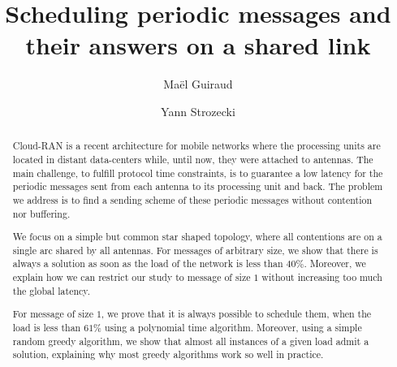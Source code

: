 \documentclass[10pt, conference, letterpaper]{IEEEtran}
\title{Scheduling periodic messages and their answers on a shared link}
\author[1,2]{Ma\"el Guiraud}
\author[1]{Yann Strozecki}
\affil[1]{David Laboratory, UVSQ}
\affil[2]{Nokia Bell Labs France}
\begin{document}
\maketitle








\begin{abstract}
Cloud-RAN is a recent architecture for mobile networks where the processing units are located in distant data-centers while, until now, they were attached to antennas. The main challenge, to fulfill protocol time constraints, is to guarantee a low latency for the periodic messages sent from each antenna to its processing unit and back. The problem we address is to find a sending scheme of these periodic messages without contention nor buffering.

We focus on a simple but common star shaped topology, where all contentions are on a single arc shared by all antennas. For messages of arbitrary size, we show that there is always a solution as soon as the load of the network is less than $40\%$. Moreover, we explain how we can restrict our study to message of size $1$ without increasing too much the global latency. 

For message of size $1$, we prove that it is always possible to schedule them, when the load is less than $61\%$  using a polynomial time algorithm. Moreover, using a simple random greedy algorithm, we show that almost all instances of a given load admit a solution, explaining why most greedy algorithms work so well in practice.  
\end{abstract}
\end{document}
